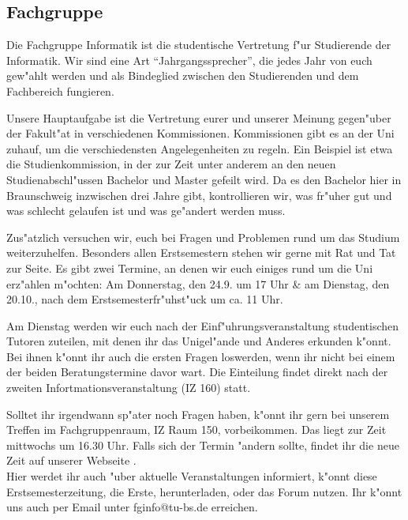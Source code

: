 \subsection{Fachgruppe}

Die Fachgruppe Informatik ist die studentische Vertretung f"ur Studierende der Informatik.
Wir sind eine Art "`Jahrgangssprecher"', die jedes Jahr von euch gew"ahlt werden und als Bindeglied zwischen den Studierenden und dem Fachbereich fungieren.

Unsere Hauptaufgabe ist die Vertretung eurer und unserer Meinung gegen"uber der
Fakult"at in verschiedenen Kommissionen. Kommissionen gibt es an der Uni zuhauf, um die verschiedensten Angelegenheiten zu regeln. Ein Beispiel ist etwa die Studienkommission, in der zur Zeit unter anderem an den neuen Studienabschl"ussen Bachelor und Master gefeilt wird. Da es den Bachelor hier in Braunschweig inzwischen drei Jahre gibt, kontrollieren wir, was fr"uher gut und was schlecht gelaufen ist und was ge"andert werden muss.

Zus"atzlich versuchen wir, euch bei Fragen und Problemen rund um das Studium weiterzuhelfen. Besonders allen Erstsemestern stehen wir gerne mit Rat und Tat zur Seite. 
Es gibt zwei Termine, an denen wir euch einiges rund um die Uni erz"ahlen m"ochten: Am Donnerstag, den 24.9. um 17 Uhr \& am Dienstag, den 20.10., nach dem Erstsemesterfr"uhst"uck um ca. 11 Uhr. \par
Am Dienstag werden wir euch nach der Einf"uhrungsveranstaltung studentischen Tutoren zuteilen, mit denen ihr das Unigel"ande und Anderes erkunden k"onnt. Bei ihnen k"onnt ihr auch die ersten Fragen loswerden, wenn ihr nicht bei einem der beiden Beratungstermine davor wart.
Die Einteilung findet direkt nach der zweiten Infortmationsveranstaltung (IZ 160) statt.

Solltet ihr irgendwann sp"ater noch Fragen haben, k"onnt ihr gern bei unserem Treffen im Fachgruppenraum, IZ Raum 150, vorbeikommen. Das liegt zur Zeit mittwochs um 16.30 Uhr. 
Falls sich der Termin "andern sollte, findet ihr die neue Zeit auf unserer Webseite \mbox{}. \\
Hier werdet ihr auch "uber aktuelle Veranstaltungen informiert, k"onnt diese Erstsemesterzeitung, die Erste, herunterladen, oder das Forum nutzen.
Ihr k"onnt uns auch per Email unter fginfo@tu-bs.de erreichen.
